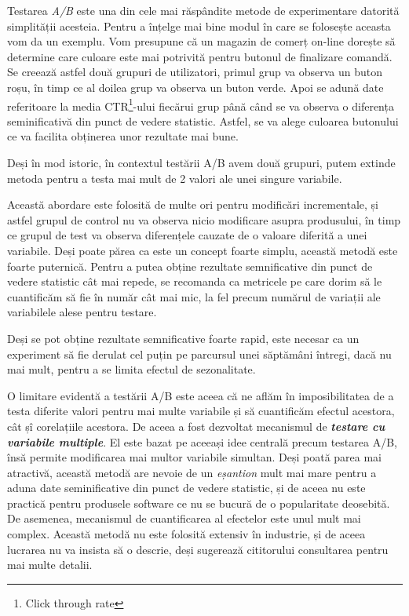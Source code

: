 Testarea \textit{A/B} este una din cele mai răspândite metode de experimentare datorită simplității acesteia. Pentru a înțelge mai bine modul în care se folosește aceasta vom da un exemplu. Vom presupune că un magazin de comerț on-line dorește să determine care culoare este mai potrivită pentru butonul de finalizare comandă. Se creează astfel două grupuri de utilizatori, primul grup va observa un buton roșu, în timp ce al doilea grup va observa un buton verde. Apoi se adună date referitoare la media CTR\footnote{Click through rate}-ului fiecărui grup până când se va observa o diferența seminificativă din punct de vedere statistic. Astfel, se va alege culoarea butonului ce va facilita obținerea unor rezultate mai bune. 

\begin{remark}
	Deși în mod istoric, în contextul testării A/B avem două grupuri, putem extinde metoda pentru a testa mai mult de 2 valori ale unei singure variabile.
\end{remark}

Această abordare este folosită de multe ori pentru modificări incrementale, și astfel grupul de control nu va observa nicio modificare asupra produsului, în timp ce grupul de test va observa diferențele cauzate de o valoare diferită a unei variabile. Deși poate părea ca este un concept foarte simplu, această metodă este foarte puternică. Pentru a putea obține rezultate semnificative din punct de vedere statistic cât mai repede, se recomanda ca metricele pe care dorim să le cuantificăm să fie în număr cât mai mic, la fel precum numărul de variații ale variabilele alese pentru testare.

\begin{remark}
	Deși se pot obține rezultate semnificative foarte rapid, este necesar ca un experiment să fie derulat cel puțin pe parcursul unei săptămâni întregi, dacă nu mai mult, pentru a se limita efectul de sezonalitate.
\end{remark}

O limitare evidentă a testării A/B este aceea că ne aflăm în imposibilitatea de a testa diferite valori pentru mai multe variabile și să cuantificăm efectul acestora, cât șî corelațiile acestora. De aceea a fost dezvoltat mecanismul de \textbf{\textit{testare cu variabile multiple}}. El este bazat pe aceeași idee centrală precum testarea A/B, însă permite modificarea mai multor variabile simultan. Deși poată parea mai atractivă, această metodă are nevoie de un \textit{eșantion} mult mai mare pentru a aduna date seminificative din punct de vedere statistic, și de aceea nu este practică pentru produsele software ce nu se bucură de o popularitate deosebită. De asemenea, mecanismul de cuantificarea al efectelor este unul mult mai complex. Această metodă nu este folosită extensiv în industrie, și de aceea lucrarea nu va insista să o descrie, deși sugerează cititorului consultarea \cite{johnson1992applied} pentru mai multe detalii.

